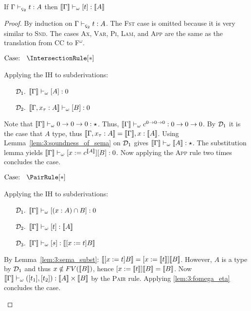 \begin{theorem}
    \label{lem:3:soundness}
    If $\Gamma \vdash_{\ced} t : A$ then $\llbracket \Gamma \rrbracket \vdash_\omega [t] : \llbracket A \rrbracket$
\end{theorem}
\begin{proof}
    By induction on $\Gamma \vdash_{\ced} t : A$.
    The \textsc{Fst} case is omitted because it is very similar to \textsc{Snd}.
    The cases \textsc{Ax}, \textsc{Var}, \textsc{Pi}, \textsc{Lam}, and \textsc{App} are the same as the translation from CC to F$^\omega$.

    $\text{Case: }\begin{array}{c} \IntersectionRule[*] \end{array}$
    \begin{proofcase}
        Applying the IH to subderivations:
        \begin{enumerate}
            \item[$\mathcal{D}_{1}.$] $\llbracket \Gamma \rrbracket \vdash_\omega [A] : 0$
            \item[$\mathcal{D}_{2}.$] $\llbracket \Gamma, x_\tau : A \rrbracket \vdash_\omega [B] : 0$
        \end{enumerate}
        Note that $\llbracket \Gamma \rrbracket \vdash_\omega 0 \to 0 \to 0 : \star$.
        Thus, $\llbracket \Gamma \rrbracket \vdash_\omega c^{0 \to 0 \to 0} : 0 \to 0 \to 0$.
        By $\mathcal{D}_{1}$ it is the case that $A$ type, thus $\llbracket \Gamma, x_\tau : A \rrbracket = \llbracket \Gamma \rrbracket, x : \llbracket A \rrbracket$.
        Using Lemma~\ref{lem:3:soundness_of_sema} on $\mathcal{D}_{1}$ gives $\llbracket \Gamma \rrbracket \vdash_\omega \llbracket A \rrbracket : \star$.
        The substitution lemma yields $\llbracket \Gamma \rrbracket \vdash_\omega [x := c^{\llbracket A \rrbracket}][B] : 0$.
        Now applying the \textsc{App} rule two times concludes the case.
    \end{proofcase}

    $\text{Case: }\begin{array}{c} \PairRule[*] \end{array}$
    \begin{proofcase}
        Applying the IH to subderivations:
        \begin{enumerate}
            \item[$\mathcal{D}_{1}.$] $\llbracket \Gamma \rrbracket \vdash_\omega [(x : A) \cap B] : 0$
            \item[$\mathcal{D}_{2}.$] $\llbracket \Gamma \rrbracket \vdash_\omega [t] : \llbracket A \rrbracket$
            \item[$\mathcal{D}_{3}.$] $\llbracket \Gamma \rrbracket \vdash_\omega [s] : \llbracket [x := t]B \rrbracket$
        \end{enumerate}
        By Lemma~\ref{lem:3:sema_subst}: $\llbracket [x := t]B \rrbracket = [x := \llbracket t \rrbracket]\llbracket B \rrbracket$.
        However, $A$ is a type by $\mathcal{D}_{1}$ and thus $x \notin FV(\llbracket B \rrbracket)$, hence $[x := \llbracket t \rrbracket]\llbracket B \rrbracket = \llbracket B \rrbracket$.
        Now $\llbracket \Gamma \rrbracket \vdash_\omega ([t_1], [t_2]) : \llbracket A \rrbracket \times \llbracket B \rrbracket$ by the \textsc{Pair} rule.
        Applying \ref{lem:3:fomega_eta} concludes the case.
    \end{proofcase}


\end{proof}
